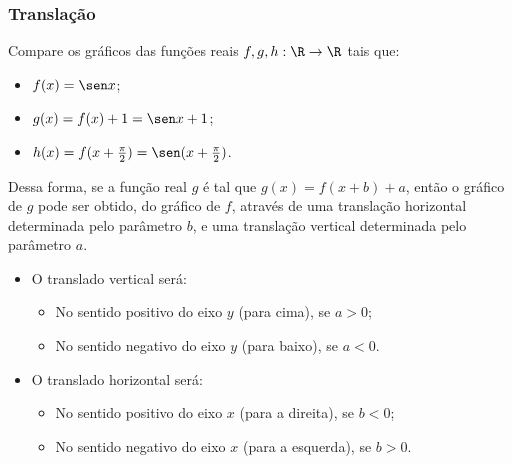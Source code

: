 \subsubsection{Translação}

\begin{example}
    Compare os gráficos das funções reais $f, g , h: \R \to \R$ tais que:
    \begin{itemize}
    \item $f(x) = \sen x$;
    \item $g(x) = f(x) + 1 = \sen x +1$;
    \item $h(x)= f(x+\frac {\pi} 2)= \sen (x+ \frac {\pi} 2)$.
    \end{itemize}
    
    \begin{center}
      
    \end{center}

    \begin{center}
      
    \end{center}

\end{example}


Dessa forma, se a função real $g$ é tal que $g(x) = f(x+b) +a$,
então o gráfico de $g$ pode ser obtido, do gráfico de $f$, através
de uma translação horizontal determinada pelo parâmetro $b$, e uma
translação vertical determinada pelo parâmetro $a$. 
\begin{itemize}
  \item O translado vertical será:
        \begin{itemize}
          \item No sentido positivo do eixo $y$ (para cima), se
          $a>0$;
          \item No sentido negativo do eixo $y$ (para baixo), se
          $a<0$.
        \end{itemize} 
  \item O translado horizontal será:
        \begin{itemize}
          \item No sentido positivo do eixo $x$ (para a direita), se $b<0$;
          \item No sentido negativo do eixo $x$ (para a esquerda), se $b>0$.
        \end{itemize}
\end{itemize}